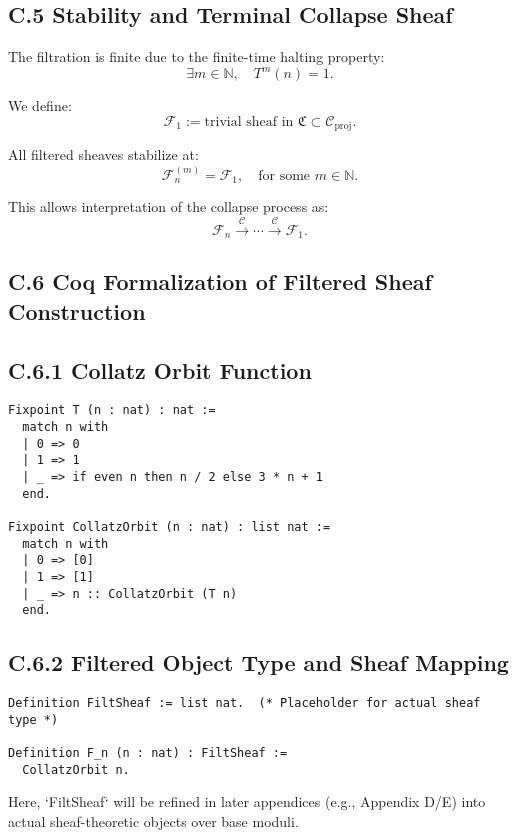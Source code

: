 \documentclass[11pt]{article}
\begin{document}
\subsection*{C.5 Stability and Terminal Collapse Sheaf}

The filtration is finite due to the finite-time halting property:
\[
\exists m \in \mathbb{N}, \quad T^m(n) = 1.
\]

We define:
\[
\mathcal{F}_1 := \text{trivial sheaf in } \mathfrak{C} \subset \mathcal{C}_{\mathrm{proj}}.
\]

\noindent All filtered sheaves stabilize at:
\[
\mathcal{F}_n^{(m)} = \mathcal{F}_1, \quad \text{for some } m \in \mathbb{N}.
\]

This allows interpretation of the collapse process as:
\[
\mathcal{F}_n \xrightarrow{\mathcal{C}} \cdots \xrightarrow{\mathcal{C}} \mathcal{F}_1.
\]

\subsection*{C.6 Coq Formalization of Filtered Sheaf Construction}

\subsection*{C.6.1 Collatz Orbit Function}

\begin{lstlisting}[language=Coq]
Fixpoint T (n : nat) : nat :=
  match n with
  | 0 => 0
  | 1 => 1
  | _ => if even n then n / 2 else 3 * n + 1
  end.

Fixpoint CollatzOrbit (n : nat) : list nat :=
  match n with
  | 0 => [0]
  | 1 => [1]
  | _ => n :: CollatzOrbit (T n)
  end.
\end{lstlisting}

\subsection*{C.6.2 Filtered Object Type and Sheaf Mapping}

\begin{lstlisting}[language=Coq]
Definition FiltSheaf := list nat.  (* Placeholder for actual sheaf type *)

Definition F_n (n : nat) : FiltSheaf :=
  CollatzOrbit n.
\end{lstlisting}

Here, `FiltSheaf` will be refined in later appendices (e.g., Appendix D/E) into actual sheaf-theoretic objects over base moduli.
\end{document}
